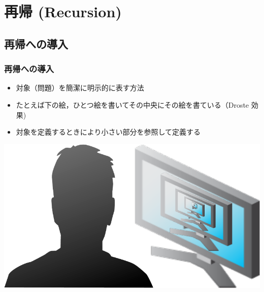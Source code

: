 \section{再帰 (Recursion)}
\subsection{再帰への導入}
\begin{frame}
\frametitle{再帰への導入}
  \begin{itemize}
\item 対象（問題）を簡潔に明示的に表す方法
\item たとえば下の絵，ひとつ絵を書いてその中央にその絵を書ている（Droste 効果)
\item 対象を定義するときにより小さい部分を参照して定義する

  \end{itemize}
  \begin{center}
\includegraphics[scale=0.5]{./Figure/Droste.pdf}
  \end{center}
\end{frame}
